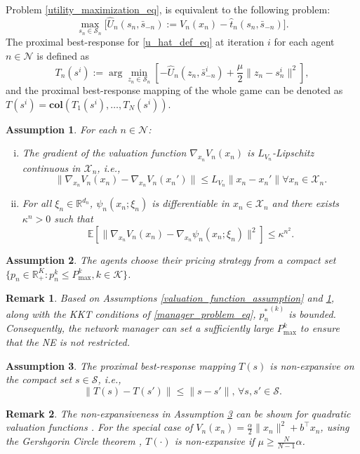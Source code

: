 \documentclass[twocolumn]{autart}
\newtheorem{remark}{Remark}
\newtheorem{assumption}{Assumption}
\begin{document}
Problem \eqref{utility_maximization_eq}, is equivalent to the following problem:
\begin{equation}\label{u_hat_def_eq}
    \max_{s_n\in\mathcal{S}_n}{[\widehat{U}_n(s_n, \bar{s}_{-n})}:=V_n(x_n)-\hat{t}_n(s_n, \bar{s}_{-n})].
\end{equation}
The proximal best-response for \eqref{u_hat_def_eq} at iteration $i$ for each agent $n\in\mathcal{N}$ is defined as
\[
T_n(s^i) := \arg\min_{z_n\in\mathcal{S}_n}{\left[-\widehat{U}_n(z_n, \bar{s}_{-n}^i)+\frac{\mu}{2}\|z_n-s_n^i\|^2\right]},
\]
and the proximal best-response mapping of the whole game can be denoted as $T(s^i)=\textbf{col}(T_1(s^i), \ldots, T_N(s^i))$.
\begin{assumption}\label{ass2}
	For each $n\in\mathcal{N}$: \begin{enumerate}[(i)]
	    \item The gradient of the valuation function $\nabla_{x_n}V_n(x_n)$ is $L_{V_n}$-Lipschitz continuous in $\mathcal{X}_n$, i.e., \[\|\nabla_{x_n}V_n(x_n)-\nabla_{x_n}V_n(x_n')\|\leq L_{V_n}\|x_n-x_n'\| \forall x_n\in\mathcal{X}_n.\]
        \item For all $\xi_n\in\mathbb{R}^{d_n}$, $\psi_n(x_n;\xi_n)$ is differentiable in $x_n\in\mathcal{X}_n$ and there exists $\kappa^n>0$ such that \[\mathbb{E}[\|\nabla_{x_n}V_n(x_n)-\nabla_{x_n}\psi_n(x_n;\xi_n)\|^2]\leq \kappa^{n^2}.\]
        
	\end{enumerate}  
\end{assumption}
\begin{assumption}\label{ass3}
	The agents choose their pricing strategy from a compact set $\{p_n\in\mathbb{R}^K_+:p_n^k\leq P_{\text{max}}^k, k\in\mathcal{K}\}$.
\end{assumption}
\begin{remark}
	Based on Assumptions \ref{valuation_function_assumption} and \ref{ass2}, along with the KKT conditions of \eqref{manager_problem_eq}, ${p_n^*}^{(k)}$ is bounded. Consequently, the network manager can set a sufficiently large $P_{\text{max}}^k$ to ensure that the NE is not restricted. 
\end{remark}
\begin{assumption}\label{ass5}
    The proximal best-response mapping $T(s)$ is non-expansive on the compact set $s\in\mathcal{S}$, i.e., \[\|T(s)-T(s')\|\leq\|s-s'\|, \, \forall s,s'\in\mathcal{S}.\]
\end{assumption}
\begin{remark}
   The non-expansiveness in Assumption \ref{ass5} can be shown for quadratic valuation functions \cite{grammatico2015decentralized}. For the special case of $V_n(x_n)=\frac{\alpha}{2}\|x_n\|^2+b^\top x_n$, using the Gershgorin Circle theorem \cite[Theorem 1.1]{varga2011gervsgorin}, $T(\cdot)$ is non-expansive if $\mu\geq \frac{N}{N-1}\alpha$.
\end{remark}
\end{document}
